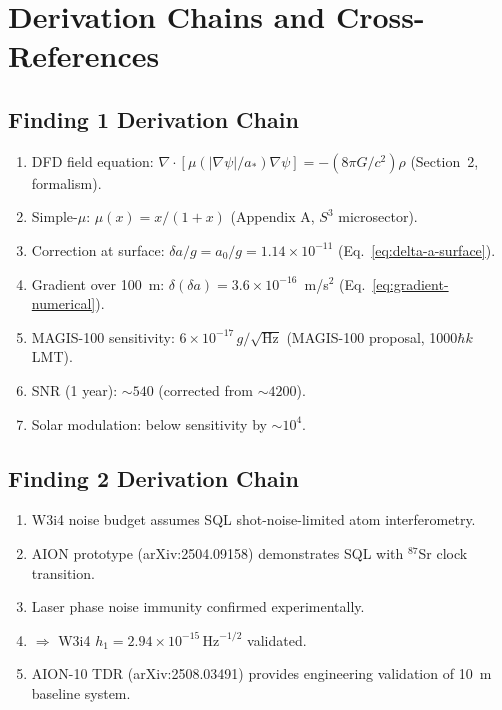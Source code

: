 \documentclass[11pt]{article}
\theoremstyle{definition}
\theoremstyle{remark}
\newcommand{\ee}[1]{\times10^{#1}}
\newcommand{\sqrtHz}{\,\mathrm{Hz}^{-1/2}}
\newcommand{\astar}{a_*}
\newcommand{\azero}{a_0}
\begin{document}
\section{Derivation Chains and Cross-References}
\label{sec:chains}

\subsection{Finding 1 Derivation Chain}

\begin{enumerate}[nosep]
\item DFD field equation: $\nabla\cdot[\mu(|\nabla\psi|/\astar)\nabla\psi]
  = -(8\pi G/c^2)\rho$ (Section~2, formalism).
\item Simple-$\mu$: $\mu(x) = x/(1+x)$ (Appendix A, $S^3$ microsector).
\item Correction at surface: $\delta a/g = \azero/g = 1.14\ee{-11}$
  (Eq.~\ref{eq:delta-a-surface}).
\item Gradient over 100~m: $\delta(\delta a) = 3.6\ee{-16}$~m/s$^2$
  (Eq.~\ref{eq:gradient-numerical}).
\item MAGIS-100 sensitivity: $6\ee{-17}\,g/\sqrt{\mathrm{Hz}}$
  (MAGIS-100 proposal, 1000$\hbar k$ LMT).
\item SNR (1 year): $\sim 540$ (corrected from $\sim 4200$).
\item Solar modulation: below sensitivity by $\sim 10^4$.
\end{enumerate}

\subsection{Finding 2 Derivation Chain}

\begin{enumerate}[nosep]
\item W3i4 noise budget assumes SQL shot-noise-limited atom interferometry.
\item AION prototype (arXiv:2504.09158) demonstrates SQL with ${}^{87}$Sr
  clock transition.
\item Laser phase noise immunity confirmed experimentally.
\item $\Rightarrow$ W3i4 $h_1 = 2.94\ee{-15}\sqrtHz$ validated.
\item AION-10 TDR (arXiv:2508.03491) provides engineering validation
  of 10~m baseline system.
\end{enumerate}
\end{document}
